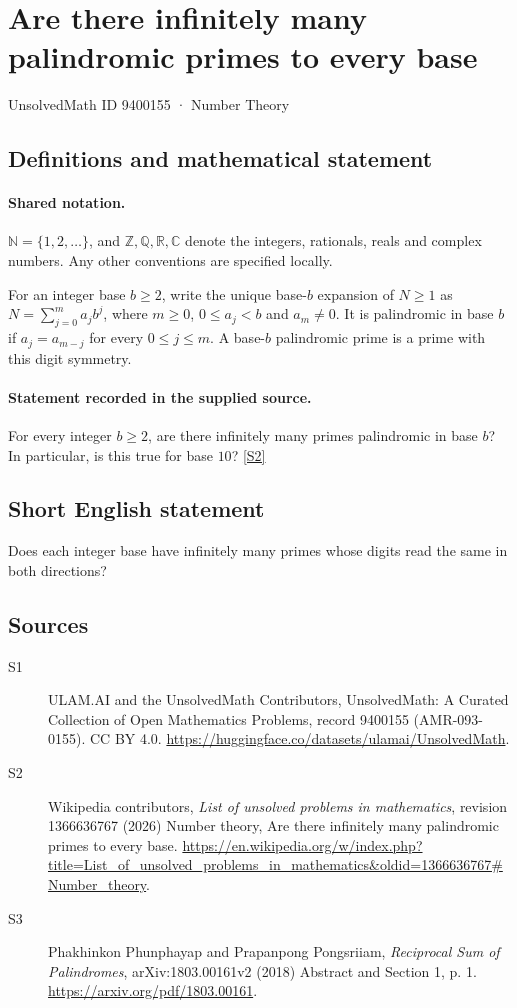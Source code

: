 \documentclass[11pt]{article}
\newcommand{\sref}[2]{\hyperlink{source:#1:#2}{[S#2]}}
\begin{document}
\setcounter{section}{9400154}
\section{Are there infinitely many palindromic primes to every base}\label{9400155}
{\small\sffamily UnsolvedMath ID 9400155 · Number Theory}
\subsection{Definitions and mathematical statement}

\paragraph{Shared notation.}$\mathbb N=\{1,2,\ldots\}$, and $\mathbb Z,\mathbb Q,\mathbb R,\mathbb C$ denote the integers, rationals, reals and complex numbers. Any other conventions are specified locally.


For an integer base $b\ge2$, write the unique base-$b$ expansion of $N\ge1$ as $N=\sum_{j=0}^m a_jb^j$, where $m\ge0$, $0\le a_j<b$ and $a_m\ne0$. It is palindromic in base $b$ if $a_j=a_{m-j}$ for every $0\le j\le m$. A base-$b$ palindromic prime is a prime with this digit symmetry.
\paragraph{Statement recorded in the supplied source.}
For every integer $b\ge2$, are there infinitely many primes palindromic in base $b$? In particular, is this true for base $10$? \sref{9400155}{2}
\subsection{Short English statement}
Does each integer base have infinitely many primes whose digits read the same in both directions?
\subsection{Sources}
\begin{description}
\item[\hypertarget{source:9400155:1}{S1}] ULAM.AI and the UnsolvedMath Contributors, UnsolvedMath: A Curated Collection of Open Mathematics Problems, record 9400155 (AMR-093-0155). CC BY 4.0. \url{https://huggingface.co/datasets/ulamai/UnsolvedMath}.
\item[\hypertarget{source:9400155:2}{S2}] Wikipedia contributors, \emph{List of unsolved problems in mathematics}, revision 1366636767 (2026) Number theory, Are there infinitely many palindromic primes to every base. \url{https://en.wikipedia.org/w/index.php?title=List_of_unsolved_problems_in_mathematics&oldid=1366636767#Number_theory}.
\item[\hypertarget{source:9400155:3}{S3}] Phakhinkon Phunphayap and Prapanpong Pongsriiam, \emph{Reciprocal Sum of Palindromes}, arXiv:1803.00161v2 (2018) Abstract and Section 1, p. 1. \url{https://arxiv.org/pdf/1803.00161}.
\end{description}
\label{end:9400155}
\end{document}
